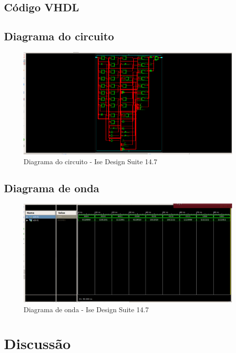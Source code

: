 \documentclass[12pts]{article}
\begin{document}
\newpage
\subsection{Código VHDL}

\newpage

\subsection{Diagrama do circuito}

\begin{figure}[!htb]
  \centering
  \includegraphics[scale=0.4]{img/circuito}
  \caption{Diagrama do circuito - Ise Design Suite 14.7}	
  \label{figRotulo}
\end{figure}

\subsection{Diagrama de onda}
\begin{figure}[!htb]
  \centering
  \includegraphics[scale=0.3]{img/onda}
  \caption{Diagrama de onda - Ise Design Suite 14.7}
  \label{figRotulo}
\end{figure}
\newpage

\section{Discussão}

\end{document}
